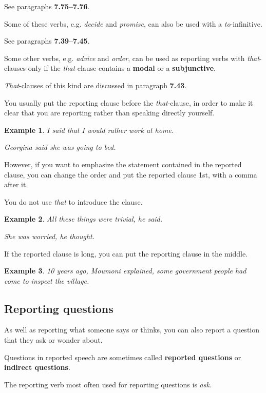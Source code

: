 \documentclass[oneside]{book}
\numberwithin{equation}{section}
\newtheorem{example}{Example}[section]
\begin{document}
See paragraphs \textbf{7.75--7.76}.

%
Some of these verbs, e.g. \textit{decide} and \textit{promise}, can also be used with a \textit{to}-infinitive.

See paragraphs \textbf{7.39--7.45}.

%
Some other verbs, e.g. \textit{advice} and \textit{order}, can be used as reporting verbs with \textit{that}-clauses only if the \textit{that}-clause contains a \textbf{modal} or a \textbf{subjunctive}.

\textit{That}-clauses of this kind are discussed in paragraph \textbf{7.43}.

%
\noindent{} You usually put the reporting clause before the \textit{that}-clause, in order to make it clear that you are reporting rather than speaking directly yourself.
\begin{example}
    I said that I would rather work at home.
    
    Georgina said she was going to bed.
\end{example}
However, if you want to emphasize the statement contained in the reported clause, you can change the order and put the reported clause 1st, with a comma after it.

You do not use \textit{that} to introduce the clause.
\begin{example}
    All these things were trivial, he said.
    
    She was worried, he thought.
\end{example}
If the reported clause is long, you can put the reporting clause in the middle.
\begin{example}
    10 years ago, Moumoni explained, some government people had come to inspect the village.
\end{example}

\subsection{Reporting questions}
\noindent{} As well as reporting what someone says or thinks, you can also report a question that they ask or wonder about.

%
Questions in reported speech are sometimes called \textbf{reported questions} or \textbf{indirect questions}.

%
\noindent{} The reporting verb most often used for reporting questions is \textit{ask}.
\end{document}
